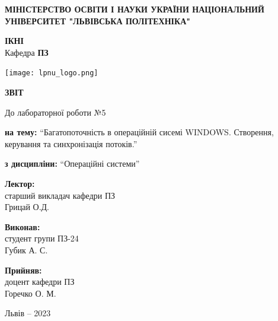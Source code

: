 \documentclass[12pt]{extarticle}
\begin{document}
\begin{titlepage}
    \begin{center}
        \textbf{\normalsize{\MakeUppercase{
            Міністерство Освіти і науки України
            Національний університет "Львівська політехніка"
        }}}

        \begin{flushright}
        \textbf{ІКНІ}\\
        Кафедра \textbf{ПЗ}
        \end{flushright}
        \vspace{15mm}

        \texttt{[image: lpnu\_logo.png]}

        \vspace*{\fill}

        \textbf{\normalsize{\MakeUppercase{Звіт}}}
            
        До лабораторної роботи №5

        \textbf{на тему:} “Багатопоточність в операційній сисемі WINDOWS. Створення,
        керування та синхронізація потоків.”

        \textbf{з дисципліни:} “Операційні системи”
            
        \vspace*{\fill}

        \begin{flushright}

            \textbf{Лектор:}\\
            старший викладач кафедри ПЗ\\
            Грицай О.Д.\\
            \vspace{12pt}

            \textbf{Виконав:}\\
            студент групи ПЗ-24\\
            Губик А. С.\\
            \vspace{12pt}

            \textbf{Прийняв:}\\
            доцент кафедри ПЗ\\
            Горечко О. М.\\
        \vspace{12pt}
        \end{flushright}

        Львів -- 2023
            
            
    \end{center}
\end{titlepage}
\end{document}
